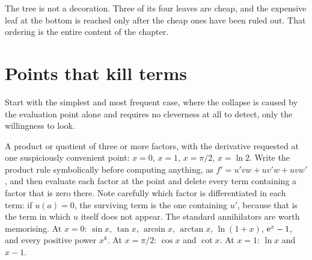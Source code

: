 \begin{center}
\end{center}

The tree is not a decoration. Three of its four leaves are cheap, and the expensive leaf at the bottom is reached only after the cheap ones have been ruled out. That ordering is the entire content of the chapter.

\section{Points that kill terms}

Start with the simplest and most frequent case, where the collapse is caused by the evaluation point alone and requires no cleverness at all to detect, only the willingness to look.

\cue A product or quotient of three or more factors, with the derivative requested at one suspiciously convenient point: $x=0$, $x=1$, $x=\pi/2$, $x=\ln 2$.
\method Write the product rule symbolically before computing anything, as $f'=u'vw+uv'w+uvw'$, and then evaluate each factor at the point and delete every term containing a factor that is zero there. Note carefully which factor is differentiated in each term: if $u(a)=0$, the surviving term is the one containing $u'$, because that is the term in which $u$ itself does not appear. The standard annihilators are worth memorising. At $x=0$: $\sin x$, $\tan x$, $\arcsin x$, $\arctan x$, $\ln(1+x)$, $\mathrm{e}^{x}-1$, and every positive power $x^{k}$. At $x=\pi/2$: $\cos x$ and $\cot x$. At $x=1$: $\ln x$ and $x-1$.


